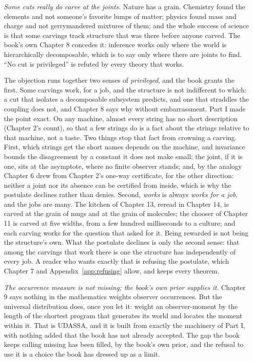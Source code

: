 \emph{Some cuts really do carve at the joints.} Nature has a grain. Chemistry found the elements and not someone's favorite lumps of matter; physics found mass and charge and not gerrymandered mixtures of them; and the whole success of science is that some carvings track structure that was there before anyone carved. The book's own Chapter 8 concedes it: inference works only where the world is hierarchically decomposable, which is to say only where there are joints to find. ``No cut is privileged'' is refuted by every theory that works.

The objection runs together two senses of \emph{privileged}, and the book grants the first. Some carvings work, for a job, and the structure is not indifferent to which: a cut that isolates a decomposable subsystem predicts, and one that straddles the coupling does not, and Chapter 8 says why without embarrassment. Part I made the point exact. On any machine, almost every string has no short description (Chapter 2's count), so that a few strings do is a fact about the strings relative to that machine, not a taste. Two things stop that fact from crowning a carving. First, which strings get the short names depends on the machine, and invariance bounds the disagreement by a constant it does not make small; the joint, if it is one, sits at the asymptote, where no finite observer stands; and, by the analogy Chapter 6 drew from Chapter 2's one-way certificate, for the other direction: neither a joint nor its absence can be certified from inside, which is why the postulate declines rather than denies. Second, \emph{works} is always \emph{works for a job}, and the jobs are many. The kitchen of Chapter 13, reread in Chapter 14, is carved at the grain of mugs and at the grain of molecules; the chooser of Chapter 11 is carved at five widths, from a few hundred milliseconds to a culture; and each carving works for the question that asked for it. Being rewarded is not being the structure's own. What the postulate declines is only the second sense: that among the carvings that work there is one the structure has independently of every job. A reader who wants exactly that is refusing the postulate, which Chapter 7 and Appendix~\ref{app:refusing} allow, and keeps every theorem.

\emph{The occurrence measure is not missing; the book's own prior supplies it.} Chapter 9 says nothing in the mathematics weights observer occurrences. But the universal distribution does, once you let it: weight an observer-moment by the length of the shortest program that generates its world and locates the moment within it. That is UDASSA, and it is built from exactly the machinery of Part I, with nothing added that the book has not already accepted. The gap the book keeps calling missing has been filled, by the book's own prior, and the refusal to use it is a choice the book has dressed up as a limit.

